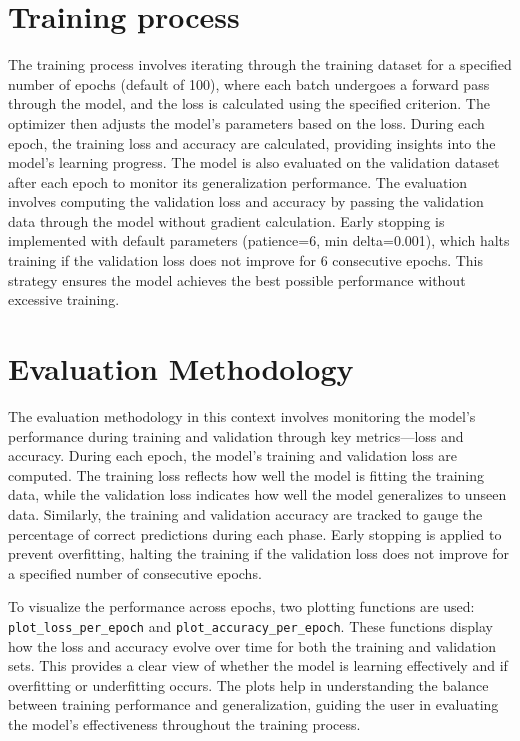 \documentclass[12pt]{article}
\begin{document}
\section*{Training process}
The training process involves iterating through the training dataset for a specified number of epochs (default of 100), where each batch undergoes a forward pass through the model, and the loss is calculated using the specified criterion. The optimizer then adjusts the model's parameters based on the loss. During each epoch, the training loss and accuracy are calculated, providing insights into the model's learning progress. The model is also evaluated on the validation dataset after each epoch to monitor its generalization performance. The evaluation involves computing the validation loss and accuracy by passing the validation data through the model without gradient calculation. Early stopping is implemented with default parameters (patience=6, min delta=0.001), which halts training if the validation loss does not improve for 6 consecutive epochs. This strategy ensures the model achieves the best possible performance without excessive training.

\section*{Evaluation Methodology}
The evaluation methodology in this context involves monitoring the model's performance during training and validation through key metrics—loss and accuracy. During each epoch, the model's training and validation loss are computed. The training loss reflects how well the model is fitting the training data, while the validation loss indicates how well the model generalizes to unseen data. Similarly, the training and validation accuracy are tracked to gauge the percentage of correct predictions during each phase. Early stopping is applied to prevent overfitting, halting the training if the validation loss does not improve for a specified number of consecutive epochs.

To visualize the performance across epochs, two plotting functions are used: \texttt{plot\_loss\_per\_epoch} and \texttt{plot\_accuracy\_per\_epoch}. These functions display how the loss and accuracy evolve over time for both the training and validation sets. This provides a clear view of whether the model is learning effectively and if overfitting or underfitting occurs. The plots help in understanding the balance between training performance and generalization, guiding the user in evaluating the model’s effectiveness throughout the training process.
\end{document}
